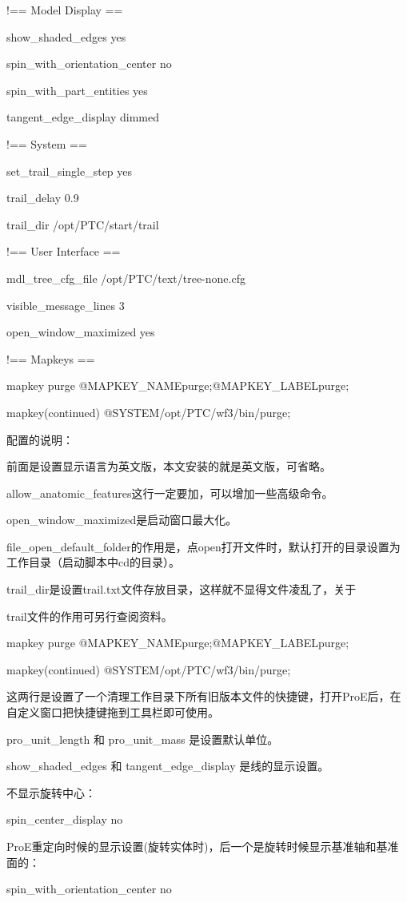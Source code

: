 !== Model Display ==

show\_shaded\_edges yes

spin\_with\_orientation\_center no

spin\_with\_part\_entities yes

tangent\_edge\_display dimmed

!== System ==

set\_trail\_single\_step yes

trail\_delay 0.9

trail\_dir /opt/PTC/start/trail

!== User Interface ==

mdl\_tree\_cfg\_file /opt/PTC/text/tree-none.cfg

visible\_message\_lines 3

open\_window\_maximized yes

!== Mapkeys ==

mapkey purge @MAPKEY\_NAMEpurge;@MAPKEY\_LABELpurge;\

mapkey(continued) @SYSTEM/opt/PTC/wf3/bin/purge;


配置的说明：

前面是设置显示语言为英文版，本文安装的就是英文版，可省略。

allow\_anatomic\_features这行一定要加，可以增加一些高级命令。

open\_window\_maximized是启动窗口最大化。

file\_open\_default\_folder的作用是，点open打开文件时，默认打开的目录设置为工作目录（启动脚本中cd的目录）。

trail\_dir是设置trail.txt文件存放目录，这样就不显得文件凌乱了，关于

trail文件的作用可另行查阅资料。

mapkey purge @MAPKEY\_NAMEpurge;@MAPKEY\_LABELpurge;\

mapkey(continued) @SYSTEM/opt/PTC/wf3/bin/purge;

这两行是设置了一个清理工作目录下所有旧版本文件的快捷键，打开ProE后，在自定义窗口把快捷键拖到工具栏即可使用。

pro\_unit\_length 和 pro\_unit\_mass 是设置默认单位。

show\_shaded\_edges 和 tangent\_edge\_display 是线的显示设置。

不显示旋转中心：

spin\_center\_display no

ProE重定向时候的显示设置(旋转实体时)，后一个是旋转时候显示基准轴和基准面的：

spin\_with\_orientation\_center no

